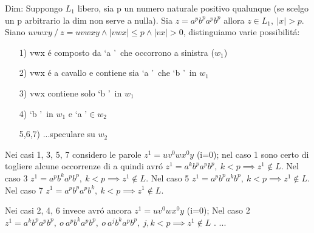 Dim: Suppongo $L_1$ libero, sia p un numero naturale positivo qualunque (se scelgo un p arbitrario la dim non serve a nulla).
Sia $z=a^pb^pa^pb^p$ allora $z \in L_1,\ |x| > p$. Siano $uvwxy\ / \ z = uvwxy \land |vwx| \leq p \land |vx| > 0$, distinguiamo varie possibilit\'a:
\begin{itemize}
\item[1)] vwx \'e composto da \lq a \rq\ che occorrono a sinistra ($w_1$)\\
\item[2)] vwx \'e a cavallo e contiene sia \lq a \rq\ che \lq b \rq\ in $w_1$\\
\item[3)] vwx contiene solo \lq b \rq\ in $w_1$\\
\item[4)] \lq b \rq\ in $w_1$ e \lq a \rq $\in w_2$\\
\item[5,6,7)] ...speculare su $w_2$\\
\end{itemize} 

Nei casi 1, 3, 5, 7 considero le parole $z^1=uv^0wx^0y$ (i=0);
nel caso 1 sono certo di togliere alcune occorrenze di a quindi avr\'o $z^1 = a^k b^p a^p b^p,\ k < p \implies z^1 \not\in L$. 
Nel caso 3 $z^1 = a^p b^k a^p b^p,\ k < p \implies z^1 \not\in L$.
Nel caso 5 $z^1 = a^p b^p a^k b^p,\ k < p \implies z^1 \not\in L$.
Nel caso 7 $z^1 = a^p b^p a^p b^k,\ k < p \implies z^1 \not\in L$.

Nei casi 2, 4, 6 invece avr\'o ancora $ z^1=uv^0wx^0y $ (i=0);
Nel caso 2 $z^1 = a^k b^p a^p b^p,\ o\ a^p b^k a^p b^p,\ o\ a^j b^k a^p b^p,\ j,k < p \implies z^1 \not\in L$ .
...

